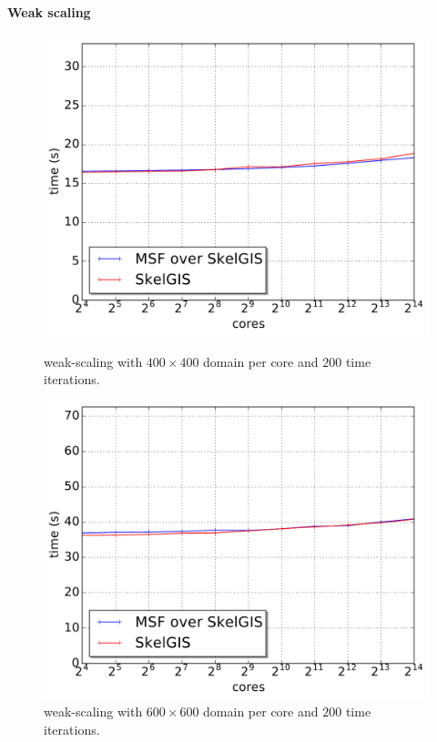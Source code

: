 \paragraph{\textbf{Weak scaling}}
\begin{figure}[t]
\begin{minipage}{.475\textwidth}
  \includegraphics[width=\textwidth]{../results/weak_scaling/400_200/median_weak.pdf}
  \caption{weak-scaling with $400 \times 400$ domain per core and $200$ time iterations.}
  \label{fig:weak1}
\end{minipage}
\hfill
\begin{minipage}{.475\textwidth}
  \includegraphics[width=\textwidth]{../results/weak_scaling/600_200/median_weak.pdf}
  \caption{weak-scaling with $600 \times 600$ domain per core and $200$ time iterations.}
  \label{fig:weak2}
\end{minipage}\end{figure}

